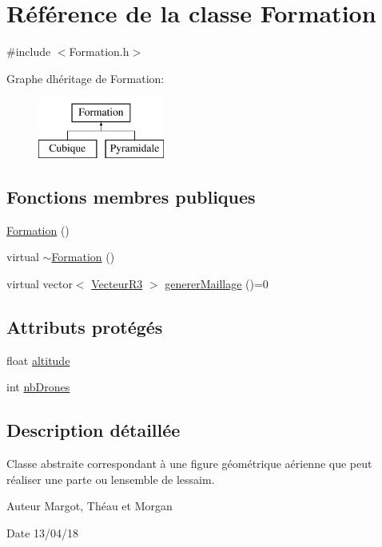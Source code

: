 \hypertarget{class_formation}{}\section{Référence de la classe Formation}
\label{class_formation}


{\ttfamily \#include $<$Formation.\+h$>$}

Graphe d\textquotesingle{}héritage de Formation\+:\begin{figure}[H]
\begin{center}
\leavevmode
\includegraphics[height=2.000000cm]{class_formation}
\end{center}
\end{figure}
\subsection*{Fonctions membres publiques}
\begin{DoxyCompactItemize}
\item 
\mbox{\hyperlink{class_formation_a60c3058dd353550d89183ec529909cb6}{Formation}} ()
\item 
virtual \mbox{\hyperlink{class_formation_a5b4ffd37549ec211d85e52c916f35eb6}{$\sim$\+Formation}} ()
\item 
virtual vector$<$ \mbox{\hyperlink{class_vecteur_r3}{Vecteur\+R3}} $>$ \mbox{\hyperlink{class_formation_ad1044228c0a1a4ee585ffe7f615c06ea}{generer\+Maillage}} ()=0
\end{DoxyCompactItemize}
\subsection*{Attributs protégés}
\begin{DoxyCompactItemize}
\item 
float \mbox{\hyperlink{class_formation_a46ac97ac7c664d265c91a9ba3c718282}{altitude}}
\item 
int \mbox{\hyperlink{class_formation_a946670f42a19f84960990e9ffb781877}{nb\+Drones}}
\end{DoxyCompactItemize}


\subsection{Description détaillée}
Classe abstraite correspondant à une figure géométrique aérienne que peut réaliser une parte ou l\textquotesingle{}ensemble de l\textquotesingle{}essaim. \begin{DoxyAuthor}{Auteur}
Margot, Théau et Morgan 
\end{DoxyAuthor}
\begin{DoxyDate}{Date}
13/04/18 
\end{DoxyDate}


